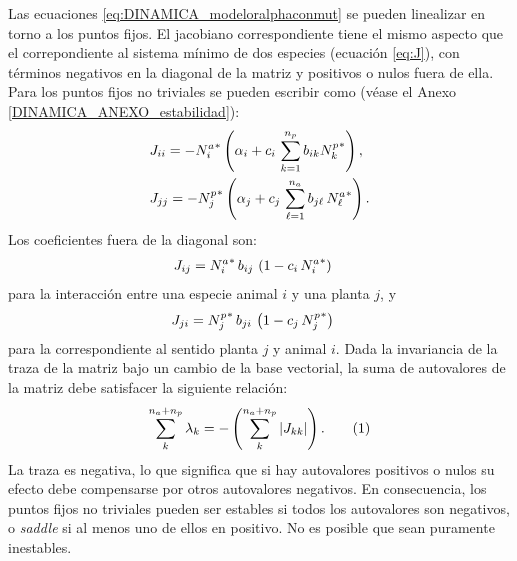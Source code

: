 Las ecuaciones  \ref{eq:DINAMICA_modeloralphaconmut} se pueden linealizar en torno a los puntos fijos. El jacobiano correspondiente tiene el mismo aspecto que el correpondiente al sistema mínimo de dos especies (ecuación \eqref{eq:J}), con términos negativos en la diagonal de la matriz y positivos o nulos fuera de ella. Para los puntos fijos no triviales se pueden escribir como (véase el Anexo \ref{DINAMICA_ANEXO_estabilidad}):
\begin{align}
\displaystyle & J_{ii}= - {N^{a}_{i}}^* \left(\alpha_{i} + c_{i} \,  \sum_{k=1}^{n_{p}} b_{ik} {N^{p}_{k}}^* \right), \nonumber\\
\displaystyle & J_{jj}= - {N^{p}_{j}}^* \left(\alpha_{j} + c_{j} \, \sum_{\ell=1}^{n_{a}} b_{j\ell}\, {N^{a}_{\ell}}^*\right).
\label{eq:Jii}
\end{align}
Los coeficientes fuera de la diagonal son:
\begin{align}
\displaystyle & J_{ij}={N^{a}_{i}}^* \, b_{ij}\, \left( 1-c_{i}\, {N^{a}_{i}}^*\right) 
\label{eq:Jij1}
\end{align}
para la interacción entre una especie animal $i$ y una planta $j$, y 
\begin{align}
\displaystyle & J_{ji}={N^{p}_{j}}^* \, b_{ji}\, \left( 1-c_{j}\, {N^{p}_{j}}^*\right)
\label{eq:Jij2}
\end{align}
para la correspondiente al sentido planta $j$ y animal $i$. Dada la invariancia de la traza de la matriz bajo un cambio de la base vectorial, la suma de autovalores de la matriz debe satisfacer la siguiente relación:
\begin{equation}
  \sum_{k}^{n_{a}+n_{p}} \lambda_{k}= - \left(\sum_{k}^{n_{a}+n_{p}} |J_{kk}| \right) .
  \stepcounter{equation}\tag{\theequation}\label{eq:sum_lambdas2}
\end{equation}
La traza es negativa, lo que significa que si hay autovalores positivos o nulos su efecto debe compensarse por otros autovalores negativos. En consecuencia, los puntos fijos no triviales pueden ser estables si todos los autovalores son negativos, o \textit{saddle} si al menos uno de ellos en positivo. No es posible que sean puramente inestables.

